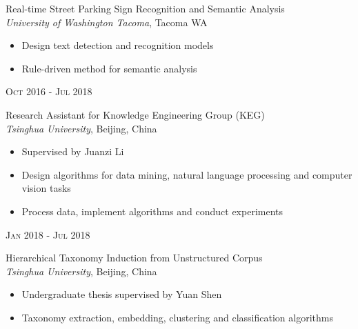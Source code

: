 \documentclass[10pt]{article} %
\begin{document}
{\begin{minipage}[t]{0.5\textwidth}
{\raggedright\large Real-time Street Parking Sign Recognition and Semantic Analysis\\
\textit{University of Washington Tacoma}, Tacoma WA\\[5pt]}

\normalsize{\begin{itemize}
		\item Design text detection and recognition models
		\item Rule-driven method for semantic analysis
\end{itemize}}

{\raggedleft\textsc{Oct 2016 - Jul 2018}\par}

{\raggedright\large Research Assistant for Knowledge Engineering Group (KEG)\\
\textit{Tsinghua University}, Beijing, China\\[5pt]}

\normalsize{\begin{itemize}
		\item Supervised by Juanzi Li
		\item Design algorithms for data mining, natural language processing and computer vision tasks
		\item Process data, implement algorithms and conduct experiments
\end{itemize}}

{\raggedleft\textsc{Jan 2018 - Jul 2018}\par}

{\raggedright\large Hierarchical Taxonomy Induction from Unstructured Corpus\\
	\textit{Tsinghua University}, Beijing, China\\[5pt]}

\normalsize{\begin{itemize}
		\item Undergraduate thesis supervised by Yuan Shen
		\item Taxonomy extraction, embedding, clustering and classification algorithms
\end{itemize}}




\end{minipage} %
\hfill
\begin{minipage}[t]{0.44\textwidth} %
\vspace{0pt} %


\end{minipage}}
\end{document}
